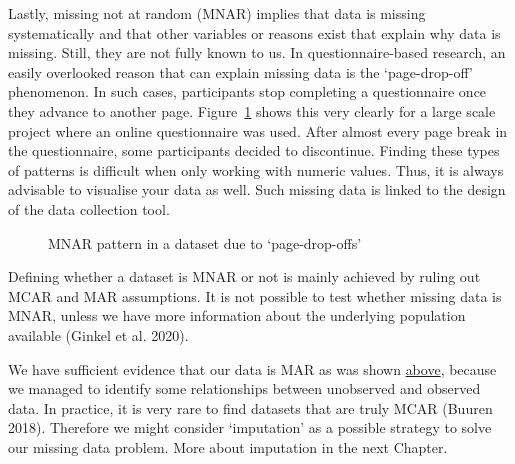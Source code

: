 \documentclass[
  letterpaper,
]{krantz}
\begin{document}
Lastly, missing not at random (MNAR) implies that data is missing
systematically and that other variables or reasons exist that explain
why data is missing. Still, they are not fully known to us. In
questionnaire-based research, an easily overlooked reason that can
explain missing data is the `page-drop-off' phenomenon. In such cases,
participants stop completing a questionnaire once they advance to
another page. Figure~\ref{fig-mnar-example} shows this very clearly for
a large scale project where an online questionnaire was used. After
almost every page break in the questionnaire, some participants decided
to discontinue. Finding these types of patterns is difficult when only
working with numeric values. Thus, it is always advisable to visualise
your data as well. Such missing data is linked to the design of the data
collection tool.

\begin{figure}


\caption{\label{fig-mnar-example}MNAR pattern in a dataset due to
`page-drop-offs'}

\end{figure}%

Defining whether a dataset is MNAR or not is mainly achieved by ruling
out MCAR and MAR assumptions. It is not possible to test whether missing
data is MNAR, unless we have more information about the underlying
population available (Ginkel et al. 2020).

We have sufficient evidence that our data is MAR as was shown
\hyperref[missing-at-random-mar]{above}, because we managed to identify
some relationships between unobserved and observed data. In practice, it
is very rare to find datasets that are truly MCAR (Buuren 2018).
Therefore we might consider `imputation' as a possible strategy to solve
our missing data problem. More about imputation in the next Chapter.
\end{document}
